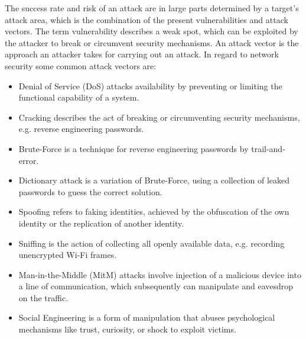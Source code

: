The success rate and risk of an attack are in large parts determined by a target's attack area, which is the combination of the present vulnerabilities and attack vectors.
The term vulnerability describes a weak spot, which can be exploited by the attacker to break or circumvent security mechanisms.
An attack vector is the approach an attacker takes for carrying out an attack.
In regard to network security some common attack vectors are:

\begin{itemize}
    \item Denial of Service (DoS) attacks availability by preventing or limiting the functional capability of a system.
    \item Cracking describes the act of breaking or circumventing security mechanisms, e.g. reverse engineering passwords.
    \item Brute-Force is a technique for reverse engineering passwords by trail-and-error.
    \item Dictionary attack is a variation of Brute-Force, using a collection of leaked passwords to guess the correct solution.
    \item Spoofing refers to faking identities, achieved by the obfuscation of the own identity or the replication of another identity.
    \item Sniffing is the action of collecting all openly available data, e.g. recording unencrypted Wi-Fi frames.
    \item Man-in-the-Middle (MitM) attacks involve injection of a malicious device into a line of communication, which subsequently can manipulate and eavesdrop on the traffic.
    \item Social Engineering is a form of manipulation that abuses psychological mechanisms like trust, curiosity, or shock to exploit victims.
\end{itemize}

\cite[page~16-20]{IT_Basiswissen}


